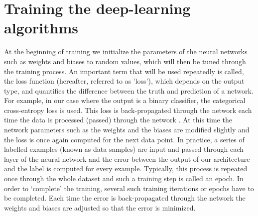 \documentclass{aa}
\begin{document}
    


\section{Training the deep-learning algorithms}\label{sec: training ML}

At the beginning of training we initialize the parameters of the neural networks such as weights and biases to random values, which will then be tuned through the training process. %
An important term that will be used repeatedly is called, the loss function (hereafter, referred to as 'loss'), which depends on the output type, and quantifies the difference between the truth and prediction of a network.
For example, in our case where the output is a binary classifier, the categorical cross-entropy loss is used.
This loss is back-propagated through the network each time the data is processed (passed) through the network \citep{Rojas1996}.
At this time the network parameters such as the weights and the biases are modified slightly and the loss is once again computed for the next data point.
In practice, a series of labelled examples (known as data samples) are input and passed through each layer of the neural network and the error between the output of our architecture and the label is computed for every example.
Typically, this process is repeated once through the whole dataset and such a training step is called an epoch.
In order to `complete' the training, several such training iterations or epochs have to be completed.
Each time the error is back-propagated through the network the weights and biases are adjusted so that the error is minimized.
\end{document}
